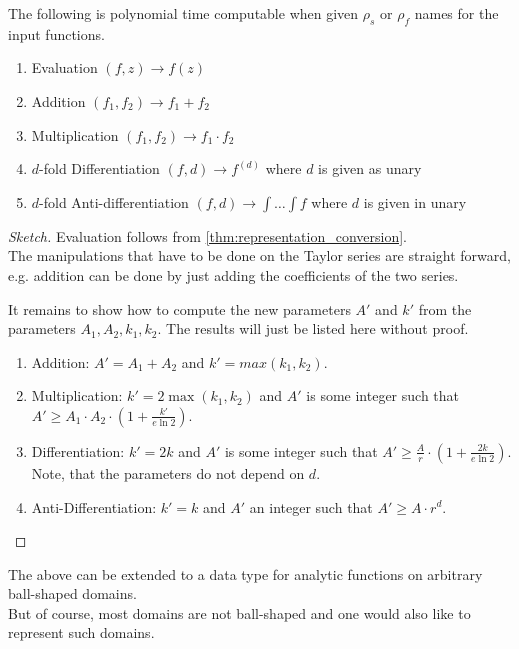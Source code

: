 	 \begin{theorem}\label{thm:polytime_on_ball}
	 	The following is polynomial time computable when given $\rho_s$ or $\rho_f$ names for the input functions.
	 	\begin{enumerate}
	 		\item Evaluation $(f,z) \to f(z)$
	 		\item Addition $(f_1, f_2) \to f_1 + f_2$
	 		\item Multiplication $(f_1, f_2) \to f_1 \cdot f_2$
	 		\item $d$-fold Differentiation $(f,d) \to f^{(d)}$ where $d$ is given as unary
	 		\item $d$-fold Anti-differentiation $(f,d) \to \int \dots \int f$ where $d$ is given in unary
	 	\end{enumerate}
    \begin{proof}[Sketch]
	 		Evaluation follows from \ref{thm:representation_conversion}. \\
	 		The manipulations that have to be done on the Taylor series are straight forward, 
      e.g. addition can be done by just adding the coefficients of the two series.
      
	 		It remains to show how to compute the new parameters $A'$ and $k'$ from the parameters $A_1, A_2, k_1, k_2$. 
      The results will just be listed here without proof.
      \begin{enumerate}
        \item Addition: $A' = A_1 + A_2$ and $k' = max(k_1, k_2)$.
        \item Multiplication: $k' = 2\max(k_1, k_2)$ and $A'$ is some integer such that $A' \geq A_1 \cdot A_2 \cdot (1 + \frac{k'}{e \ln 2})$.
        \item Differentiation: $k' = 2k$ and $A'$ is some integer such that $A' \geq \frac{A}{r} \cdot (1+\frac{2k}{e\ln 2})$.
          Note, that the parameters do not depend on $d$.
        \item Anti-Differentiation: $k' = k$ and $A'$ an integer such that $A' \geq A \cdot r^d$.
      \end{enumerate}
	 	\end{proof}
	 \end{theorem}

	The above can be extended to a data type for analytic functions on arbitrary ball-shaped domains.\\
	But of course, most domains are not ball-shaped and one would also like to represent such domains.
	
